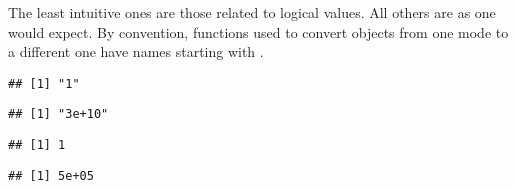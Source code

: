 \documentclass[paper=a4,10pt,div=17,headsepline,BCOR=12mm,twoside,open=right]{scrbook}\usepackage{knitr}
\begin{document}
The least intuitive ones are those related to logical values. All others are as one would expect. By convention, functions used to convert objects from one mode to a different one have names starting with .

\begin{knitrout}\footnotesize
{}\color{fgcolor}\begin{kframe}
\begin{alltt}
\hlstd{(}\hlstd{)}
\end{alltt}
\begin{verbatim}
## [1] "1"
\end{verbatim}
\begin{alltt}
\hlstd{(}\hlstd{)}
\end{alltt}
\begin{verbatim}
## [1] "3e+10"
\end{verbatim}
\begin{alltt}
\hlstd{(}\hlstd{)}
\end{alltt}
\begin{verbatim}
## [1] 1
\end{verbatim}
\begin{alltt}
\hlstd{(}\hlstd{)}
\end{alltt}
\begin{verbatim}
## [1] 5e+05
\end{verbatim}
\begin{alltt}
\hlstd{(}\hlstd{)}
\end{alltt}



\end{kframe}
\end{knitrout}
\end{document}
